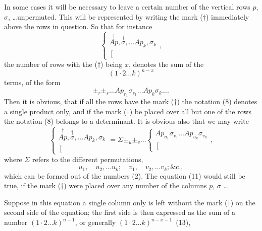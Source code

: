 \documentclass[11pt,a4paper]{article}
\theoremstyle{plain}
\theoremstyle{definition}
\theoremstyle{remark}
\begin{document}
In some cases it will be necessary to leave a certain number of the vertical
rows $p$, $\sigma$, \ldots unpermuted. This will be represented by writing the mark ($\dagger$) immediately
above the rows in question. So that for instance
\[
\left\{\begin{array}{c}
\stackrel{\dagger}{Ap}, \stackrel{\dagger}{\sigma}, \ldots Ap_k, \sigma_k \\
\left[\begin{array}{c}
\\
\end{array}\right.
\end{array}\right.
\tag{8},
\]
the number of rows with the ($\dagger$) being $x$, denotes the sum of the
\[
(1 \cdot 2 \ldots k)^{n-x}
\tag{9}
\]
terms, of the form
\[
\pm_r \pm_s \ldots Ap_{r_1}\sigma_{s_1} \ldots Ap_k\sigma_k \ldots
\tag{10}.
\]
Then it is obvious, that if all the rows have the mark ($\dagger$) the notation (8) denotes
a single product only, and if the mark ($\dagger$) be placed over all but one of the rows
the notation (8) belongs to a determinant. It is obvious also that we may write
\[
\left\{\begin{array}{c}
\stackrel{\dagger}{Ap}, \stackrel{\dagger}{\sigma}, \ldots Ap_k, \sigma_k \\
\left[\begin{array}{c}
\\
\end{array}\right.
\end{array}\right.
= \Sigma \pm_u \pm_v \ldots
\left\{\begin{array}{c}
Ap_{u_1}\sigma_{v_1} \ldots Ap_{u_k}\sigma_{v_k} \\
\left[\begin{array}{c}
\\
\end{array}\right.
\end{array}\right.
\tag{11},
\]
where $\Sigma$ refers to the different permutations,
\[
u_1, \quad u_2, \ldots u_k; \quad v_1, \quad v_2, \ldots v_k; \&\text{c.}
\tag{12},
\]
which can be formed out of the numbers (2). The equation (11) would still be true,
if the mark ($\dagger$) were placed over any number of the columns $p$, $\sigma$ \ldots

Suppose in this equation a single column only is left without the mark ($\dagger$) on
the second side of the equation; the first side is then expressed as the sum of a number
$(1 \cdot 2 \ldots k)^{n-1}$, or generally $(1 \cdot 2 \ldots k)^{n-x-1}$~(13),
\end{document}
